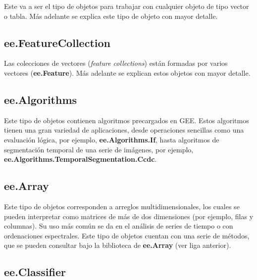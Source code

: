 \documentclass[
  12pt,
  letterpaper,
  twoside]{book}
\newcommand\boldpurple[1]{\textcolor{darkpurple}{\textbf{#1}}}
\begin{document}
Este va a ser el tipo de objetos para trabajar con cualquier objeto de tipo vector o tabla. Más adelante se explica este tipo de objeto con mayor detalle.

\hypertarget{ee.featurecollection}{%
\subsection*{ee.FeatureCollection}\label{ee.featurecollection}}

Las colecciones de vectores (\emph{feature collections}) están formadas por varios vectores (\boldpurple{ee.Feature}). Más adelante se explican estos objetos con mayor detalle.

\hypertarget{ee.algorithms}{%
\subsection*{ee.Algorithms}\label{ee.algorithms}}

Este tipo de objetos contienen algoritmos precargados en GEE. Estos algoritmos tienen una gran variedad de aplicaciones, desde operaciones sencillas como una evaluación lógica, por ejemplo, \boldpurple{ee.Algorithms.If}, hasta algoritmos de segmentación temporal de una serie de imágenes, por ejemplo, \boldpurple{ee.Algorithms.TemporalSegmentation.Ccdc}.

\hypertarget{ee.array}{%
\subsection*{ee.Array}\label{ee.array}}

Este tipo de objetos corresponden a arreglos multidimensionales, los cuales se pueden interpretar como matrices de más de dos dimensiones (por ejemplo, filas y columnas). Su uso más común se da en el análisis de series de tiempo o con ordenaciones espectrales. Este tipo de objetos cuentan con una serie de métodos, que se pueden consultar bajo la biblioteca de \boldpurple{ee.Array} (ver liga anterior).

\hypertarget{ee.classifier}{%
\subsection*{ee.Classifier}\label{ee.classifier}}
\end{document}
